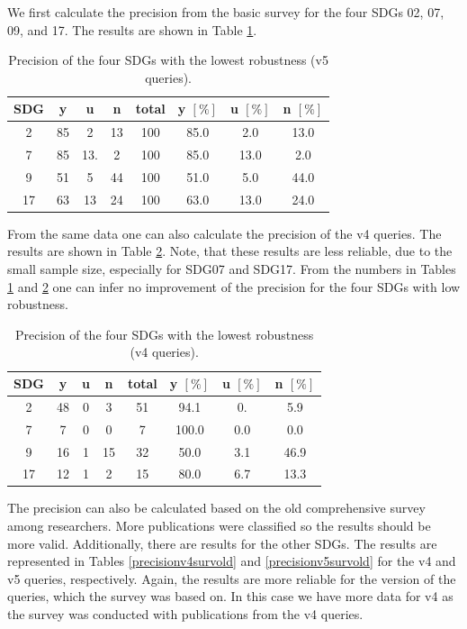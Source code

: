\documentclass{article}
\begin{document}
We first calculate the precision from the basic survey for the four SDGs 02, 07, 09, and 17. The results are shown in Table \ref{precisionv5surv}.
\begin{table}[H]
\centering 
 \begin{tabular}{cccccccc}
 \toprule
 SDG & y & u & n & total & y $[\%]$ & u $[\%]$ & n $[\%]$ \\
  \hline
2 & 85 & 2 & 13 & 100 & 85.0 & 2.0 & 13.0 \\
7 & 85 & 13. & 2 & 100 & 85.0 & 13.0 & 2.0 \\
9 & 51 & 5 & 44 & 100 & 51.0 & 5.0 & 44.0 \\
17 & 63 & 13 & 24 & 100 & 63.0& 13.0 & 24.0 \\
\bottomrule
\end{tabular}
\caption{Precision of the four SDGs with the lowest robustness (v5 queries).}\label{precisionv5surv}
\end{table}
From the same data one can also calculate the precision of the v4 queries. The results are shown in Table \ref{precisionv4surv}. Note, that these results are less reliable, due to the small sample size, especially for SDG07 and SDG17. 
From the numbers in Tables \ref{precisionv5surv} and \ref{precisionv4surv} one can infer no improvement of the precision for the four SDGs with low robustness.
\begin{table}[H]
\centering 
 \begin{tabular}{cccccccc}
 \toprule
  SDG & y & u & n & total & y $[\%]$ & u $[\%]$ & n $[\%]$ \\
  \hline
2& 48 & 0 & 3 & 51 & 94.1 & 0. & 5.9 \\
7 & 7 & 0 & 0 & 7 & 100.0 & 0.0 & 0.0 \\
9 & 16 & 1 & 15 & 32 & 50.0 & 3.1 & 46.9 \\
17 & 12 & 1 & 2 & 15 & 80.0 & 6.7 & 13.3 \\
\bottomrule
\end{tabular}\caption{Precision of the four SDGs with the lowest robustness (v4 queries).}\label{precisionv4surv}
\end{table}
The precision can also be calculated based on the old comprehensive survey among researchers. More publications were classified so the results should be more valid. Additionally, there are results for the other SDGs. The results are represented in Tables  \ref{precisionv4survold} and \ref{precisionv5survold} for the v4 and v5 queries, respectively. Again, the results are more reliable for the version of the queries, which the survey was based on. In this case we have more data for v4 as the survey was conducted with publications from the v4 queries.
\end{document}
